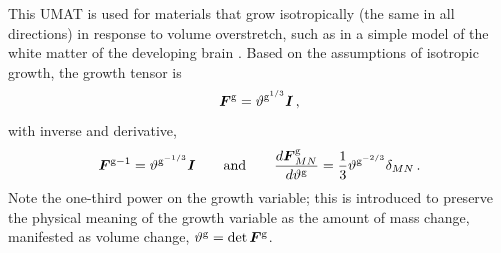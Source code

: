 \documentclass[10pt,letterpaper,oneside]{report}
\newcommand{\ten}[1]{\mbox{\boldmath $#1$}{}}
\newcommand{\scas}[1]{\mbox{{\scriptsize{${\rm{#1}}$}}}{}}
\begin{document}
This UMAT is used for materials that grow isotropically (the same in all directions) in response to volume overstretch, such as in a simple model of the white matter of the developing brain \autocite{Holland2015}.  Based on the assumptions of isotropic growth, the growth tensor is
\begin{equation}
\ten{F}^{\scas{g}} = \vartheta^{\scas{g}^{1/3}} \ten{I} \, , 
\label{Fg_iso}
\end{equation}
with inverse and derivative,
\begin{equation}
\ten{F}^{\scas{g}-1} = \vartheta^{\scas{g}^{-1/3}} \ten{I}
\qquad \text{and} \qquad
\frac{d \ten{F}^{\scas{g}}_{MN} }{d \vartheta^{\scas{g}}} = \frac{1}{3} \vartheta^{\scas{g}^{-2/3}} \delta_{MN} \, .
\label{Fg_iso2}
\end{equation}
Note the one-third power on the growth variable; this is introduced to preserve the physical meaning of the growth variable as the amount of mass change, manifested as volume change, $\vartheta^{\scas{g}} = \det \ten{F}^{\scas{g}}$.
\end{document}
